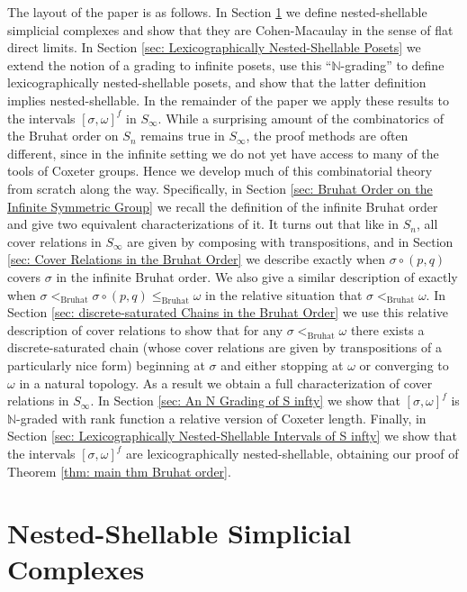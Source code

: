 \documentclass[oneside,11pt,reqno]{amsart}
\newcommand{\nn}{\ensuremath{\mathbb{N}}}
\theoremstyle{definition}
\newtheorem{proof techniques}{Proof Techniques}
\begin{document}
The layout of the paper is as follows. In Section \ref{sec: Nested-Shellable Simplicial Complexes} we define nested-shellable simplicial complexes and show that they are Cohen-Macaulay in the sense of flat direct limits. In Section \ref{sec: Lexicographically Nested-Shellable Posets} we extend the notion of a grading to infinite posets, use this ``$\nn$-grading'' to define lexicographically nested-shellable posets, and show that the latter definition implies nested-shellable. In the remainder of the paper we apply these results to the intervals $[\sigma , \omega]^f$ in $S_\infty$. While a surprising amount of the combinatorics of the Bruhat order on $S_n$ remains true in $S_\infty$, the proof methods are often different, since in the infinite setting we do not yet have access to many of the tools of Coxeter groups. Hence we develop much of this combinatorial theory from scratch along the way. Specifically, in Section \ref{sec: Bruhat Order on the Infinite Symmetric Group} we recall the definition of the infinite Bruhat order and give two equivalent characterizations of it. It turns out that like in $S_n$, all cover relations in $S_\infty$ are given by composing with transpositions, and in Section \ref{sec: Cover Relations in the Bruhat Order} we describe exactly when $\sigma \circ (p , q)$ covers $\sigma$ in the infinite Bruhat order. We also give a similar description of exactly when $\sigma <_\text{Bruhat} \sigma \circ (p , q) \leq_\text{Bruhat} \omega$ in the relative situation that $\sigma <_\text{Bruhat} \omega$. In Section \ref{sec: discrete-saturated Chains in the Bruhat Order} we use this relative description of cover relations to show that for any $\sigma <_\text{Bruhat} \omega$ there exists a discrete-saturated chain (whose cover relations are given by transpositions of a particularly nice form) beginning at $\sigma$ and either stopping at $\omega$ or converging to $\omega$ in a natural topology. As a result we obtain a full characterization of cover relations in $S_\infty$. In Section \ref{sec: An N Grading of S infty} we show that $[\sigma , \omega]^f$ is $\nn$-graded with rank function a relative version of Coxeter length. Finally, in Section \ref{sec: Lexicographically Nested-Shellable Intervals of S infty} we show that the intervals $[\sigma , \omega]^f$ are lexicographically nested-shellable, obtaining our proof of Theorem \ref{thm: main thm Bruhat order}.  


\section{Nested-Shellable Simplicial Complexes}\label{sec: Nested-Shellable Simplicial Complexes}
\end{document}
